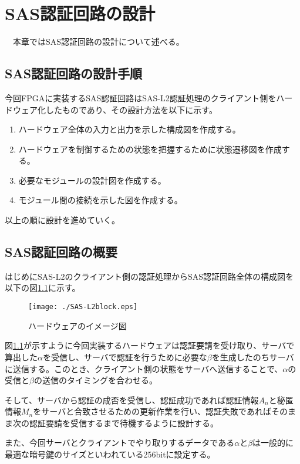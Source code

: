 \documentclass{thesis}
\begin{document}
\chapter{SAS認証回路の設計}
　本章ではSAS認証回路の設計について述べる。

\section{SAS認証回路の設計手順}
今回FPGAに実装するSAS認証回路はSAS-L2認証処理のクライアント側をハードウェア化したものであり、その設計方法を以下に示す。
\begin{enumerate}[(1)]
\item ハードウェア全体の入力と出力を示した構成図を作成する。
\item ハードウェアを制御するための状態を把握するために状態遷移図を作成する。
\item 必要なモジュールの設計図を作成する。
\item モジュール間の接続を示した図を作成する。
\end{enumerate}

以上の順に設計を進めていく。

\newpage

\section{SAS認証回路の概要}
はじめにSAS-L2のクライアント側の認証処理からSAS認証回路全体の構成図を以下の図\ref{sasl2block}に示す。
\begin{figure}[H]
 \center
 \texttt{[image: ./SAS-L2block.eps]}
 \caption{ハードウェアのイメージ図}
 \label{sasl2block}
\end{figure}

図\ref{sasl2block}が示すように今回実装するハードウェアは認証要請を受け取り、サーバで算出した$\alpha$を受信し、サーバで認証を行うために必要な$\beta$を生成したのちサーバに送信する。このとき、クライアント側の状態をサーバへ送信することで、$\alpha$の受信と$\beta$の送信のタイミングを合わせる。\par
そして、サーバから認証の成否を受信し、認証成功であれば認証情報$A_n$と秘匿情報$M_n$をサーバと合致させるための更新作業を行い、認証失敗であればそのまま次の認証要請を受信するまで待機するように設計する。\par
また、今回サーバとクライアントでやり取りするデータである$\alpha$と$\beta$は一般的に最適な暗号鍵のサイズといわれている256bitに設定する。

\newpage
\end{document}
